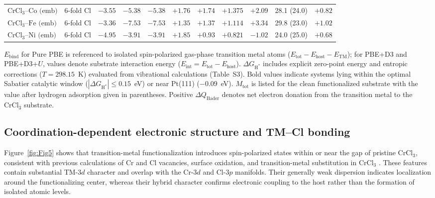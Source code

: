 \documentclass[journal=jacsat,manuscript=article]{achemso}
\begin{document}
{\begin{table}[htbp]
\begin{adjustbox}{max width=\textwidth}
\begin{tabular}{lcccccccccc}
        \midrule
        $\text{CrCl}_3\text{--Co (emb)}$ & 6-fold Cl & $-3.55$ & $-5.38$ & $-5.38$ & $+1.76$ & $+1.74$ & $+1.375$ & $+2.09$ & 28.1 (24.0) & $+0.82$ \\
        $\text{CrCl}_3\text{--Fe (emb)}$ & 6-fold Cl & $-3.36$ & $-7.53$ & $-7.53$ & $+1.35$ & $+1.37$ & $+1.114$ & $+3.34$ & 29.8 (23.0) & $+1.02$ \\
        $\text{CrCl}_3\text{--Ni (emb)}$ & 6-fold Cl & $-4.95$ & $-3.91$ & $-3.91$ & $+1.85$ & $+0.93$ & $+0.821$ & $-1.02$ & 24.0 (25.0) & $+0.68$ \\
        \bottomrule
      \end{tabular}
    \end{adjustbox}
    \vspace{1ex}
    \begin{minipage}{0.98\textwidth}
      \footnotesize\color{revcolor}
      $E_{\text{bind}}$ for Pure PBE is referenced to isolated spin-polarized gas-phase transition metal atoms ($E_{\text{tot}} - E_{\text{host}} - E_{\text{TM}}$); for PBE+D3 and PBE+D3+$U$, values denote substrate interaction energy ($E_{\text{int}} = E_{\text{tot}} - E_{\text{host}}$). $\Delta G_{\text{H}^*}$ includes explicit zero-point energy and entropic corrections ($T = 298.15$~K) evaluated from vibrational calculations (Table~S3). Bold values indicate systems lying within the optimal Sabatier catalytic window ($|\Delta G_{\text{H}^*}| \le 0.15$~eV) or near Pt(111) ($-0.09$~eV). $M_{\text{tot}}$ is listed for the clean functionalized substrate with the value after hydrogen adsorption given in parentheses. Positive $\Delta Q_{\text{Bader}}$ denotes net electron donation from the transition metal to the $\text{CrCl}_3$ substrate.
    \end{minipage}
  \end{table}
\par}
\subsection{Coordination-dependent electronic structure and TM--Cl bonding}

\noindent Figure~\ref{fig:Fig5} shows that transition-metal functionalization introduces spin-polarized states within or near the gap of pristine CrCl$_3$, consistent with previous calculations of Cr and Cl vacancies, surface oxidation, and transition-metal substitution in CrCl$_3$ \cite{Gao2018,Mastrippolito2021,Wang2019,Safi2023}. These features contain substantial TM-$3d$ character and overlap with the Cr-$3d$ and Cl-$3p$ manifolds. Their generally weak dispersion indicates localization around the functionalizing center, whereas their hybrid character confirms electronic coupling to the host rather than the formation of isolated atomic levels.
\end{document}
